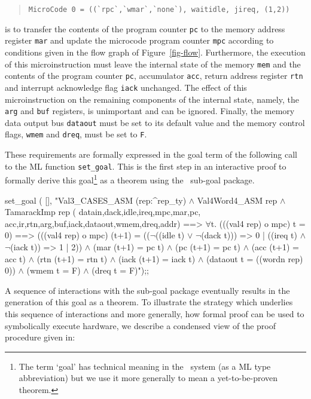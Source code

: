 \begin{quote}
\verb"MicroCode 0 = ((`rpc`,`wmar`,`none`), waitidle, jireq, (1,2))"
\end{quote}

\noindent
is to transfer
the contents of the program counter
\verb"pc" to the memory address register \verb"mar"
and update the microcode program counter \verb"mpc"
according to conditions given in the flow graph of Figure~\ref{fig-flow}.
Furthermore, the execution of this microinstruction must leave the
internal state of the memory \verb"mem" and the contents of the
program counter \verb"pc", accumulator \verb"acc", return address
register \verb"rtn" and interrupt acknowledge flag \verb"iack" unchanged.
The effect of this microinstruction on the remaining components of the
internal state,
namely, the \verb"arg" and \verb"buf" registers,
is unimportant and can be ignored.
Finally,
the memory data output bus \verb"dataout"
must be set to its default value and the memory control flags,
\verb"wmem" and \verb"dreq", must be set to \verb"F".



These requirements are formally expressed in the goal term
of the following call to the ML function \verb"set_goal".
This is the first step in an interactive proof
to formally derive this
goal\footnote{
The term `goal' has technical meaning in the \HOL\ system
(as a ML type abbreviation) but
we use it more generally to mean a \mbox{yet-to-be-proven} theorem.}
as a theorem using the
\HOL\ sub-goal package.

\newpage %

\begintt
set_goal (
  [],
  "Val3_CASES_ASM (rep:^rep_ty) \(\wedge\)
   Val4Word4_ASM rep \(\wedge\)
   TamarackImp rep (
     datain,dack,idle,ireq,mpc,mar,pc,
     acc,ir,rtn,arg,buf,iack,dataout,wmem,dreq,addr)
   ==>
   \(\forall\)t.
    (((val4 rep) o mpc) t = 0)
    ==>
    (((val4 rep) o mpc) (t+1) =
       ((\(\neg\)((idle t) \(\vee\) \(\neg\)(dack t))) => 0 |
        ((ireq t) \(\wedge\) \(\neg\)(iack t)) => 1 | 2)) \(\wedge\)
    (mar (t+1) = pc t) \(\wedge\)
    (pc (t+1) = pc t) \(\wedge\)
    (acc (t+1) = acc t) \(\wedge\)
    (rtn (t+1) = rtn t) \(\wedge\)
    (iack (t+1) = iack t) \(\wedge\)
    (dataout t = ((wordn rep) 0)) \(\wedge\)
    (wmem t = F) \(\wedge\)
    (dreq t = F)");;
\endtt

A sequence of interactions with the sub-goal package eventually
results in the generation of this goal as a theorem.
To illustrate the strategy which underlies this sequence of interactions
and more generally,
how formal proof can be used to symbolically execute hardware,
we describe a condensed view of the proof procedure
given in:


